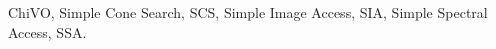 \thispagestyle{empty}
\maketitle

\vspace{0.5cm}



\vspace{0.4cm}

\begin{keywords}
	ChiVO, Simple Cone Search, SCS, Simple Image Access, SIA,
	Simple Spectral Access, SSA.
\end{keywords}

\vspace{1cm}

